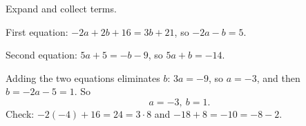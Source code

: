 Expand and collect terms.

First equation: $-2a+2b+16=3b+21$, so $-2a-b=5$.

Second equation: $5a+5=-b-9$, so $5a+b=-14$.

Adding the two equations eliminates $b$: $3a=-9$, so $a=-3$, and then $b=-2a-5=1$. So
\[
\boxed{a=-3,\ b=1}.
\]
Check: $-2(-4)+16=24=3\cdot8$ and $-18+8=-10=-8-2$.
